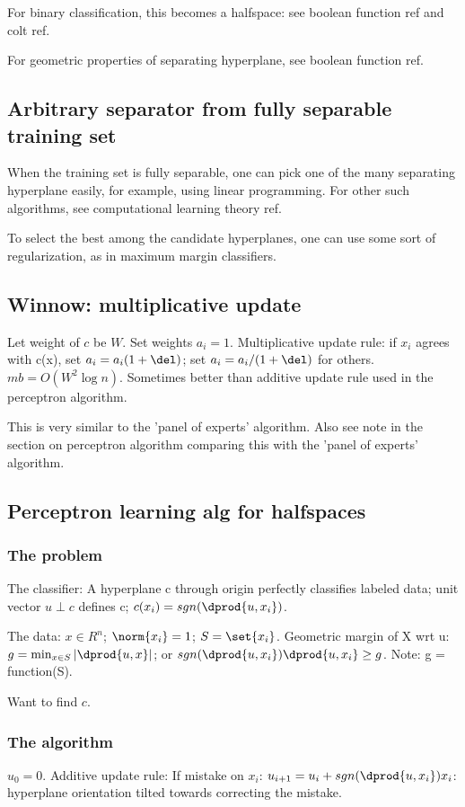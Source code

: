 \documentclass[oneside, article]{memoir}
\begin{document}
For binary classification, this becomes a halfspace: see boolean function ref and colt ref.

For geometric properties of separating hyperplane, see boolean function ref.

\subsection{Arbitrary separator from fully separable training set}
When the training set is fully separable, one can pick one of the many separating hyperplane easily, for example, using linear programming. For other such algorithms, see computational learning theory ref.

To select the best among the candidate hyperplanes, one can use some sort of regularization, as in maximum margin classifiers.

\subsection{Winnow: multiplicative update}
Let weight of $c$ be $W$. Set weights $a_{i} = 1$. Multiplicative update rule: if $x_{i}$ agrees with c(x), set $a_{i} = a_{i}(1+\del)$; set $a_{i} = a_{i}/(1+\del)$ for others. $mb = O(W^{2} \log n)$. \why Sometimes better than additive update rule used in the perceptron algorithm.

This is very similar to the 'panel of experts' algorithm. Also see note in the section on perceptron algorithm comparing this with the 'panel of experts' algorithm.

\subsection{Perceptron learning alg for halfspaces}
\subsubsection{The problem}
The classifier: A hyperplane c through origin perfectly classifies labeled data; unit vector $u \perp c$ defines c; $c(x_i) = sgn(\dprod{u, x_i})$.

The data: $x \in R^{n}$; $\norm{x_i} = 1$; $S = \set{x_i}$. Geometric margin of X wrt u: $g = \min_{x \in S} |\dprod{u, x}|$; or $sgn(\dprod{u, x_i})\dprod{u,x_{i}} \geq g$. Note: g = function(S).

Want to find $c$.

\subsubsection{The algorithm}
$u_{0} = 0$. Additive update rule: If mistake on $x_i$: $u_{i+1} = u_{i} + sgn(\dprod{u, x_i})x_i$: hyperplane orientation tilted towards correcting the mistake.
\end{document}
